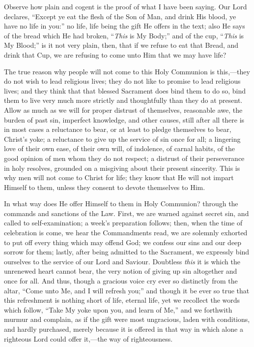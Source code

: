 Observe how plain and cogent is the proof of what I have been
saying. Our Lord declares, ``Except ye eat the flesh of the Son of
Man, and drink His blood, ye have no life in you:'' no life, life
being the gift He offers in the text; also He says of the bread which
He had broken, ``\emph{This} is My Body;'' and of the cup,
``\emph{This} is My Blood;'' is it not very plain, then, that
if we refuse to eat that Bread, and drink that Cup, we are refusing to
come unto Him that we may have life?

The true reason why people will not come to this Holy Communion is
this,—they do not wish to lead religious lives; they do not like to
promise to lead religious lives; and they think that that blessed
Sacrament does bind them to do so, bind them to live very much more
strictly and thoughtfully than they do at present. Allow as much as we
will for proper distrust of themselves, reasonable awe, the burden of
past sin, imperfect knowledge, and other causes, still after all there
is in most cases a reluctance to bear, or at least to pledge
themselves to bear, Christ's yoke; a reluctance to give up the service
of sin once for all; a lingering love of their own ease, of their own
will, of indolence, of carnal habits, of the good opinion of men whom
they do not respect; a distrust of their perseverance in holy
resolves, grounded on a misgiving about their present sincerity. This
is why men will not come to Christ for life; they know that He will
not impart Himself to them, unless they consent to devote themselves
to Him.

In what way does He offer Himself to them in Holy Communion?
through the commands and sanctions of the Law. First, we are warned
against secret sin, and called to self-examination; a week's
preparation follows; then, when the time of celebration is come, we
hear the Commandments read, we are solemnly exhorted to put off every
thing which may offend God; we confess our sins and our deep sorrow
for them; lastly, after being admitted to the Sacrament, we expressly
bind ourselves to the service of our Lord and Saviour. Doubtless \emph{this}
it is which the unrenewed heart cannot bear, the very notion of giving
up sin altogether and once for all. And thus, though a gracious voice
cry ever so distinctly from the altar, ``Come unto Me, and I will
refresh you;'' and though it be ever so true that this refreshment
is nothing short of life, eternal life, yet we recollect the words
which follow, ``Take My yoke upon you, and learn of Me,'' and
we forthwith murmur and complain, as if the gift were most ungracious,
laden with conditions, and hardly purchased, merely because it is
offered in that way in which alone a righteous Lord could offer it,—the
way of righteousness.

